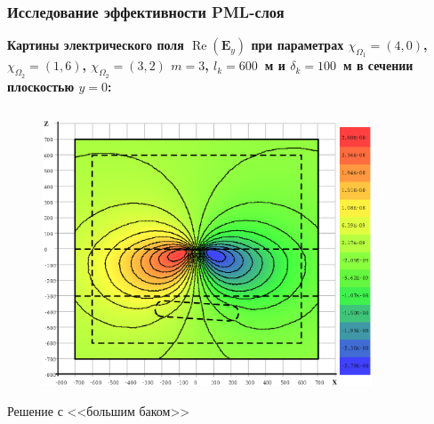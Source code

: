 \documentclass[aspectratio=43,usepdftitle=false]{beamer}
\renewcommand{\Re}{\mathop{\mathrm{Re}}\nolimits}
\newcommand{\MakeTitle}[1]{\frametitle{\hspace{1.5em}\textbf{#1} \hfill \insertframenumber{} }}
\begin{document}
\begin{frame}
	\MakeTitle{Исследование эффективности PML-слоя}
	\textbf{Картины электрического поля $\Re(\mathbf{E}_y)$ при параметрах $\chi_{\Omega_1} = (4, 0)$, $\chi_{\Omega_2} = (1, 6)$, $\chi_{\Omega_2} = (3, 2)$ $m=3$, $l_k = 600$~м и $\delta_k = 100$~м в сечении плоскостью $y=0$:}
	\begin{columns}[t,totalwidth=\linewidth]
		\hspace{-0.07\linewidth}
		\begin{column}{.5\linewidth}
			\vspace{-2.75em}
			\begin{figure}[H]
				\includegraphics[width=1.1\textwidth,height=1.1\textheight,keepaspectratio]{airloop_std_y=0_EyR.eps}
			\end{figure}
			\begin{center}
				\vspace{-1em}
				\tiny{Решение с <<большим баком>>}
			\end{center}
		\end{column}
		\begin{column}{.5\linewidth}
			\vspace{-2.75em}
			\begin{figure}[H]

\end{figure}
\end{column}
\end{columns}
\end{frame}
\end{document}
